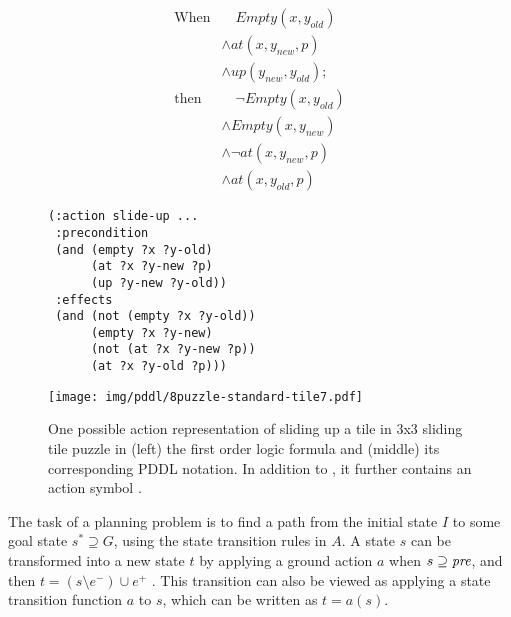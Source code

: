 \begin{figure}[htb]
\begin{minipage}[c]{0.3\linewidth}
 \small
\begin{align*}
 \text{When}  & \quad Empty(x, y_{old}) \\
        & \land at(x, y_{new}, p) \\
        & \land up(y_{new}, y_{old}) ; \\
 \text{then}  & \quad \lnot Empty(x,y_{old}) \\
        & \land Empty(x,y_{new}) \\
        & \land \lnot at(x, y_{new}, p) \\
        & \land at(x, y_{old}, p)
\end{align*}
\end{minipage}
\begin{minipage}[c]{0.42\linewidth}
 \begin{lstlisting}
(:action slide-up ...
 :precondition
 (and (empty ?x ?y-old)
      (at ?x ?y-new ?p)
      (up ?y-new ?y-old))
 :effects
 (and (not (empty ?x ?y-old))
      (empty ?x ?y-new)
      (not (at ?x ?y-new ?p))
      (at ?x ?y-old ?p)))
 \end{lstlisting}
\end{minipage}
\begin{minipage}[c]{0.25\linewidth}
 \texttt{[image: img/pddl/8puzzle-standard-tile7.pdf]}
\end{minipage}
\caption{One possible action representation of sliding up a tile in 3x3
sliding tile puzzle in (left) the first order logic formula and (middle)
its corresponding PDDL notation. In addition to
, it further contains an action symbol
.  } \label{8puzzle-action-pddl}
\end{figure}


The task of a planning problem is to find a path from the initial state
$I$ to some goal state $s^*\supseteq G$, using the state transition
rules in $A$. A state $s$ can be transformed into a new state $t$ by
applying a ground action $a$ when $s\supseteq \mbox{\textit{pre}}$, and
then $t=(s\setminus e^-)\cup e^+$ \cite{McDermott00}. This transition
can also be viewed as applying a state transition function $a$ to $s$,
which can be written as $t=a(s)$.


